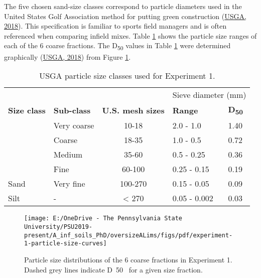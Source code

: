 \documentclass[
  letterpaper,
]{article}
\begin{document}
The five chosen sand-size classes correspond to particle diameters used in the United States Golf Association method for putting green construction (\protect\hyperlink{ref-USGA2018}{USGA, 2018}).
This specification is familiar to sports field managers and is often referenced when comparing infield mixes.
Table \ref{tab:usga-sieve-sizes-table} shows the particle size ranges of each of the 6 coarse fractions.
The D\textsubscript{50} values in Table \ref{tab:usga-sieve-sizes-table} were determined graphically (\protect\hyperlink{ref-USGA2018}{USGA, 2018}) from Figure \ref{fig:experiment-1-particle-size-curves}.

\begin{table}

\caption{\label{tab:usga-sieve-sizes-table}USGA particle size classes used for Experiment 1.}
\centering
\begin{tabular}[t]{llcll}
\toprule
\multicolumn{3}{c}{ } & \multicolumn{2}{c}{Sieve diameter (mm)} \\
\cmidrule(l{3pt}r{3pt}){4-5}
\textbf{Size class} & \textbf{Sub-class} & \textbf{U.S. mesh sizes} & \textbf{Range} & \textbf{D\textsubscript{50}}\\
\midrule
 & Very coarse & 10-18 & 2.0 - 1.0 & 1.40\\

 & Coarse & 18-35 & 1.0 - 0.5 & 0.72\\

 & Medium & 35-60 & 0.5 - 0.25 & 0.36\\

 & Fine & 60-100 & 0.25 - 0.15 & 0.19\\

\multirow{-5}{*}{\raggedright\arraybackslash Sand} & Very fine & 100-270 & 0.15 - 0.05 & 0.09\\
\cmidrule{1-5}
Silt & - & < 270 & 0.05 - 0.002 & 0.03\\
\bottomrule
\end{tabular}
\end{table}

\begin{figure}

{\centering \texttt{[image: E:/OneDrive - The Pennsylvania State University/PSU2019-present/A\_inf\_soils\_PhD/oversizeALims/figs/pdf/experiment-1-particle-size-curves]} 

}

\caption{Particle size distributions of the 6 coarse fractions in Experiment 1. Dashed grey lines indicate D~50~ for a given size fraction.}\label{fig:experiment-1-particle-size-curves}
\end{figure}
\end{document}
